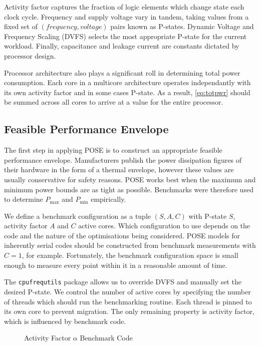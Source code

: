 Activity factor captures the fraction of logic elements which change state each clock cycle.
Frequency and supply voltage vary in tandem, taking values from a fixed set of $(frequency, voltage)$ pairs known as P-states.
Dynamic Voltage and Frequency Scaling (DVFS) selects the most appropriate P-state for the current workload.
Finally, capacitance and leakage current are constants dictated by processor design.

Processor architecture also plays a significant roll in determining total power consumption.
Each core in a multicore architecture operates independantly with its own activity factor and in some cases P-state.
As a result, \autoref{eq:totpwr} should be summed across all cores to arrive at a value for the entire processor.

\subsection{Feasible Performance Envelope}
The first step in applying POSE is to construct an appropriate feasible performance envelope.
Manufacturers publish the power dissipation figures of their hardware in the form of a thermal envelope, however these values are usually conservative for safety reasons.
POSE works best when the maximum and minimum power bounds are as tight as possible.
Benchmarks were therefore used to determine $P_{\max}$ and $P_{\min}$ empirically.

We define a benchmark configuration as a tuple $(S,A,C)$ with P-state $S$, activity factor $A$ and $C$ active cores.
Which configuration to use depends on the code and the nature of the optimisations being considered.
POSE models for inherently serial codes should be constructed from benchmark measurements with $C = 1$, for example.
Fortunately, the benchmark configuration space is small enough to measure every point within it in a reasonable amount of time.

The \texttt{cpufrequtils} package allows us to override DVFS and manually set the desired P-state.
We control the number of active cores by specifying the number of threads which should run the benchmarking routine.
Each thread is pinned to its own core to prevent migration.
The only remaining property is activity factor, which is influenced by benchmark code.

\begin{figure}[ht]
\centering
\lstset{basicstyle=\ttfamily\footnotesize\bfseries, frame=tb} %

\caption{Activity Factor $\alpha$ Benchmark Code}
\label{fig:microbench}
\end{figure}

